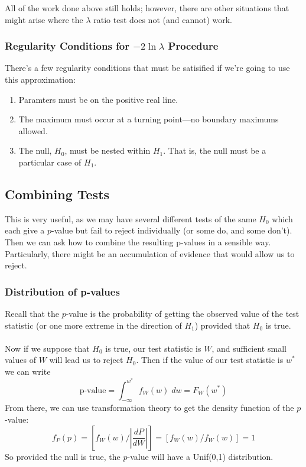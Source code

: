 \documentclass[a4paper,12pt]{scrartcl}
\begin{document}
All of the work done above still holds; however, there are other
situations that might arise where the $\lambda$ ratio test
does not (and cannot) work.


\subsubsection{Regularity Conditions for $-2 \ln \lambda$ Procedure}

There's a few regularity conditions that must be satisified if we're
going to use this approximation:
\begin{enumerate}
   \item Paramters must be on the positive real line.
   \item The maximum must occur at a turning point---no boundary
      maximums allowed.
   \item The null, $H_0$, must be nested within $H_1$. That is,
      the null must be a particular case of $H_1$.
\end{enumerate}



\newpage
\subsection{Combining Tests}

This is very useful, as we may have several different tests of the
same $H_0$ which each
give a $p$-value but fail to reject individually (or some do, and some
don't).  Then we can ask how to combine the resulting p-values in a
sensible way. Particularly, there might be an accumulation of evidence
that would allow us to reject.

\subsubsection{Distribution of p-values}

Recall that the $p$-value is the probability of getting the observed
value of the test statistic (or one more extreme in the direction of
$H_1$) provided that $H_0$ is true.
\\
\\
Now if we suppose that $H_0$
is true, our test statistic is $W$, and sufficient small values of
$W$ will lead us to reject $H_0$. Then if the value of our
test statistic is $w^*$ we can write
   \[\text{p-value} = \int^{w^*}_{-\infty} f_W(w) \; dw = F_W(w^*)\]
From there, we can use transformation theory to get the density
function of the $p$-value:
\[ f_P(p) = \left[ f_W(w) / \left\lvert \frac{dP}{dW}\right\rvert\right]
   = \left[ f_W(w) /f_W(w) \right] =1  \]
So provided the null is true, the $p$-value will have a Unif(0,1)
distribution.
\end{document}
